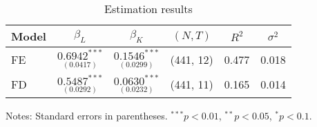 

\begin{table}[htbp]
\centering
\caption{Estimation results}
\label{tab:estimates}
\begin{tabular}{lcc|ccc}
\hline
Model & $\beta_L$ & $\beta_K$ & $(N,T)$ & $R^2$ & $\sigma^2$ \\
\hline
FE & $\underset{(0.0417)}{0.6942^{***}}$ & $\underset{(0.0299)}{0.1546^{***}}$ & (441, 12) & 0.477 & 0.018 \\
FD & $\underset{(0.0292)}{0.5487^{***}}$ & $\underset{(0.0232)}{0.0630^{***}}$ & (441, 11) & 0.165 & 0.014 \\
\hline
\end{tabular}

\begin{flushleft}
\footnotesize Notes: Standard errors in parentheses. 
$^{***}p<0.01$, $^{**}p<0.05$, $^{*}p<0.1$.
\end{flushleft}
\end{table}


